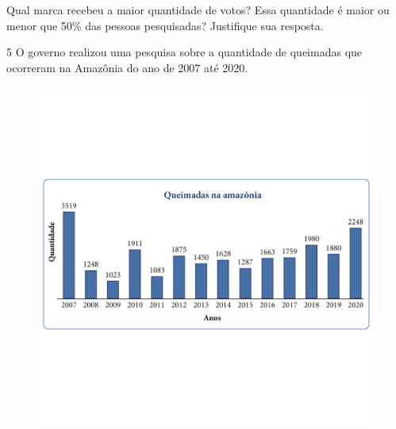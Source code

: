 
Qual marca recebeu a maior quantidade de votos? Essa quantidade é
maior ou menor que 50\% das pessoas pesquisadas? Justifique sua
resposta.




\num{5} O governo realizou uma pesquisa sobre a quantidade de queimadas
que ocorreram na Amazônia do ano de 2007 até 2020.

\begin{figure}[htpb!]
\includegraphics[width=\textwidth]{../ilustracoes/MAT5/SAEB_5ANO_MAT_figura105.png}
\end{figure}

